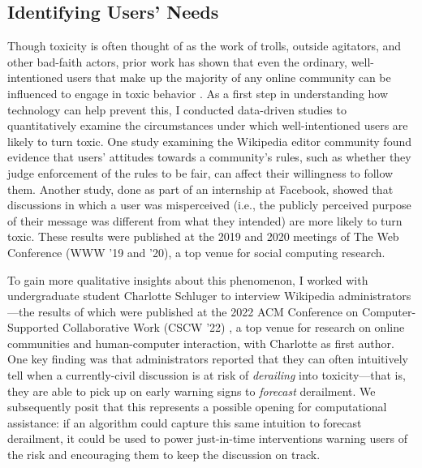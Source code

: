 \documentclass[12pt,letterpaper]{article}
\begin{document}
\subsection{Identifying Users' Needs}
Though toxicity is often thought of as the work of trolls, outside agitators, and other bad-faith actors, prior work has shown that even the ordinary, well-intentioned users that make up the majority of any online community can be influenced to engage in toxic behavior \cite{cheng_anyone_2017}.
As a first step in understanding how technology can help prevent this, I conducted data-driven studies to quantitatively examine the circumstances under which well-intentioned users are likely to turn toxic.
One study examining the Wikipedia editor community found evidence that users' attitudes towards a community's rules, such as whether they judge enforcement of the rules to be fair, can affect their willingness to follow them.
Another study, done as part of an internship at Facebook, showed that discussions in which a user was misperceived (i.e., the publicly perceived purpose of their message was different from what they intended) are more likely to turn toxic.
These results were published at the 2019 \cite{chang_trajectories_2019} and 2020 \cite{chang_dont_2020} meetings of The Web Conference (WWW '19 and '20), a top venue for social computing research.

To gain more qualitative insights about this phenomenon, I worked with undergraduate student Charlotte Schluger to interview Wikipedia administrators---the results of which were published at the 2022 ACM Conference on Computer-Supported Collaborative Work (CSCW '22) \cite{schluger_proactive_2022}, a top venue for research on online communities and human-computer interaction, with Charlotte as first author.
One key finding was that administrators reported that they can often intuitively tell when a currently-civil discussion is at risk of \emph{derailing} into toxicity---that is, they are able to pick up on early warning signs to \emph{forecast} derailment.
We subsequently posit that this represents a possible opening for computational assistance: if an algorithm could capture this same intuition to forecast derailment, it could be used to power just-in-time interventions warning users of the risk and encouraging them to keep the discussion on track.
\end{document}
